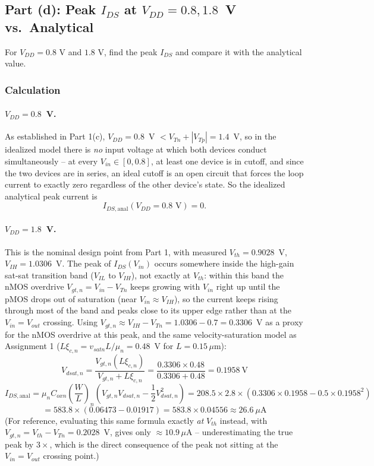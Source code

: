 \subsection{Part (d): Peak $I_{DS}$ at $V_{DD} = 0.8, 1.8$~V vs.\ Analytical}

For $V_{DD} = 0.8$ V and $1.8$ V, find the peak $I_{DS}$ and compare it with the
analytical value.

\subsubsection{Calculation}

\paragraph{$V_{DD}=0.8$~V.} As established in Part 1(c), $V_{DD}=0.8$~V $<
V_{Tn}+|V_{Tp}|=1.4$~V, so in the idealized model there is \emph{no} input
voltage at which both devices conduct simultaneously -- at every
$V_{in}\in[0,0.8]$, at least one device is in cutoff, and since the two devices
are in series, an ideal cutoff is an open circuit that forces the loop current
to exactly zero regardless of the other device's state. So the idealized
analytical peak current is
\[
I_{DS,\text{anal}}(V_{DD}=0.8\text{ V}) = 0.
\]

\paragraph{$V_{DD}=1.8$~V.} This is the nominal design point from Part 1, with
measured $V_{th}=0.9028$~V, $V_{IH}=1.0306$~V. The peak of $I_{DS}(V_{in})$
occurs somewhere inside the high-gain sat-sat transition band ($V_{IL}$ to
$V_{IH}$), not exactly at $V_{th}$: within this band the nMOS overdrive
$V_{gt,n}=V_{in}-V_{Tn}$ keeps growing with $V_{in}$ right up until the pMOS
drops out of saturation (near $V_{in}\approx V_{IH}$), so the current keeps
rising through most of the band and peaks close to its upper edge rather than at
the $V_{in}=V_{out}$ crossing. Using $V_{gt,n} \approx V_{IH}-V_{Tn} =
1.0306-0.7 = 0.3306$~V as a proxy for the nMOS overdrive at this peak, and the
same velocity-saturation model as Assignment 1
($L\xi_{c,n}=v_{satn}L/\mu_n=0.48$~V for $L=0.15\,\mu\text{m}$):
\[
V_{dsat,n} = \frac{V_{gt,n}(L\xi_{c,n})}{V_{gt,n}+L\xi_{c,n}} =
\frac{0.3306\times0.48}{0.3306+0.48} = 0.1958\ \text{V}
\]
\[
I_{DS,\text{anal}} =
\mu_nC_{oxn}\left(\frac{W}{L}\right)_n\left(V_{gt,n}V_{dsat,n}-\frac{1}{2}V_{dsat,n}^2\right)
= 208.5\times2.8\times(0.3306\times0.1958 - 0.5\times0.1958^2)
\]
\[
= 583.8\times(0.06473-0.01917) = 583.8\times0.04556 \approx 26.6\ \mu\text{A}
\]
(For reference, evaluating this same formula exactly \emph{at} $V_{th}$ instead,
with $V_{gt,n}=V_{th}-V_{Tn}=0.2028$~V, gives only $\approx10.9\,\mu\text{A}$ --
underestimating the true peak by $3\times$, which is the direct consequence of
the peak not sitting at the $V_{in}=V_{out}$ crossing point.)

